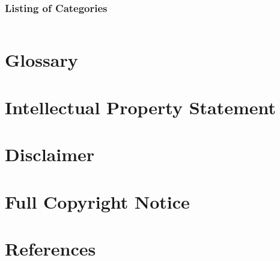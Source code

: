 \documentclass[10pt,a4paper]{article}
\begin{document}
\subsubsection{Listing of Categories}

\begin{verbatim}

\end{verbatim}

\section{Glossary}
\label{sec:glossary}


\section{Intellectual Property Statement}


\section{Disclaimer}


\section{Full Copyright Notice}


\section{References}



\end{document}

